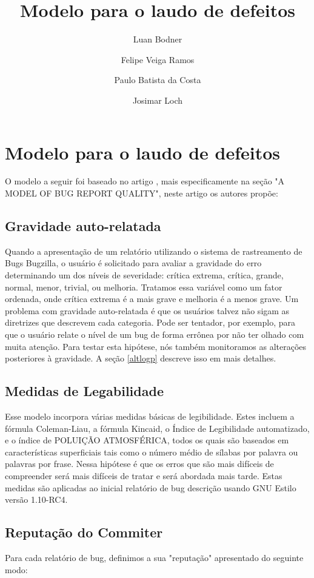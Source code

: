 \documentclass[12pt,a4paper,final]{report}
\author{Luan Bodner \\ 
        \and Felipe Veiga Ramos \\
        \and Paulo Batista da Costa\\ 
        \and Josimar Loch}
\title{Modelo para o laudo de defeitos}
\begin{document}
\maketitle
\setcounter{page}{1}

\setcounter{chapter}{1}


\section{Modelo para o laudo de defeitos}
O modelo a seguir foi baseado no artigo \cite{ModelingBugReportQuality}, mais especificamente na seção "A MODEL OF BUG REPORT QUALITY", neste artigo os autores propõe:
\subsection{Gravidade auto-relatada}
Quando a apresentação de um relatório utilizando o sistema de rastreamento de Bugs Bugzilla, o usuário é solicitado para avaliar a gravidade do erro determinando um dos níveis de severidade: crítica extrema, crítica, grande, normal, menor, trivial, ou melhoria.
Tratamos essa variável como um fator ordenada, onde crítica extrema é a mais grave e melhoria é a menos grave. Um
problema com gravidade auto-relatada é que os usuários talvez não sigam as diretrizes que descrevem cada categoria. Pode ser
tentador, por exemplo, para que o usuário relate o nível de um bug de forma errônea por não ter olhado com muita atenção. Para testar esta hipótese, nós também monitoramos as alterações posteriores à gravidade. A seção \ref{altlogp} descreve isso em mais detalhes.
\subsection{Medidas de Legabilidade}
Esse modelo incorpora várias medidas básicas de legibilidade.
Estes incluem a fórmula Coleman-Liau, a fórmula Kincaid,
o Índice de Legibilidade automatizado, e o índice de POLUIÇÃO ATMOSFÉRICA, todos os quais são baseados em características superficiais tais como o número médio de sílabas por palavra ou palavras por frase. Nessa hipótese é que os erros que são mais difíceis de compreender será mais difíceis de tratar e será
abordada mais tarde. Estas medidas são aplicadas ao inicial
relatório de bug descrição usando GNU Estilo versão 1.10-RC4.
\subsection{Reputação do Commiter}
Para cada relatório de bug, definimos a sua "reputação" apresentado do seguinte modo:
\end{document}
